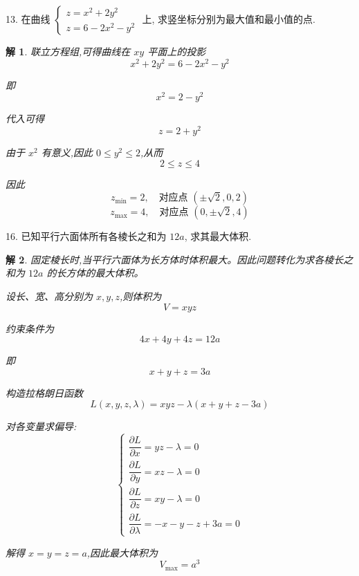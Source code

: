 \documentclass[a4paper,12pt]{article}
\newtheorem*{sol}{解}
\begin{document}
13. 在曲线 $\begin{cases}
        z = x^2 + 2y^2 \\
        z = 6 - 2x^2 - y^2
    \end{cases}$ 上, 求竖坐标分别为最大值和最小值的点.
\begin{sol}
    联立方程组,可得曲线在 $xy$ 平面上的投影
    $$x^2+2y^2=6-2x^2-y^2$$

    即
    $$x^2=2-y^2$$

    代入可得
    $$z=2+y^2$$

    由于 $x^2$ 有意义,因此 $0\leq y^2\leq 2$,从而
    $$2\leq z\leq 4$$

    因此
    $$z_{\min}=2,\quad \text{对应点 }(\pm\sqrt{2},0,2)$$
    $$z_{\max}=4,\quad \text{对应点 }(0,\pm\sqrt{2},4)$$
\end{sol}

16. 已知平行六面体所有各棱长之和为 $12a$, 求其最大体积.
\begin{sol}
    固定棱长时,当平行六面体为长方体时体积最大。因此问题转化为求各棱长之和为 $12a$ 的长方体的最大体积。

    设长、宽、高分别为 $x,y,z$,则体积为
    $$V=xyz$$

    约束条件为
    $$4x+4y+4z=12a$$

    即
    $$x+y+z=3a$$

    构造拉格朗日函数
    $$L(x,y,z,\lambda)=xyz-\lambda(x+y+z-3a)$$

    对各变量求偏导:
    $$\begin{cases}
            \dfrac{\partial L}{\partial x}=yz-\lambda=0 \\[8pt]
            \dfrac{\partial L}{\partial y}=xz-\lambda=0 \\[8pt]
            \dfrac{\partial L}{\partial z}=xy-\lambda=0 \\[8pt]
            \dfrac{\partial L}{\partial \lambda}=-x-y-z+3a=0
        \end{cases}$$

    解得 $x=y=z=a$,因此最大体积为
    $$V_{\max}=a^3$$
\end{sol}
\end{document}
